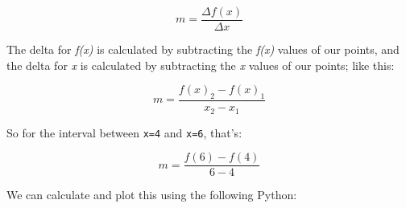 \documentclass[11pt]{article}
\begin{document}
\begin{equation}m = \frac{\Delta{f(x)}}{\Delta{x}} \end{equation}

The delta for \emph{f(x)} is calculated by subtracting the \emph{f(x)}
values of our points, and the delta for \emph{x} is calculated by
subtracting the \emph{x} values of our points; like this:

\begin{equation}m = \frac{f(x)_{2} - f(x)_{1}}{x_{2} - x_{1}} \end{equation}

So for the interval between \texttt{x=4} and \texttt{x=6}, that's:

\begin{equation}m = \frac{f(6) - f(4)}{6 - 4} \end{equation}

We can calculate and plot this using the following Python:
\end{document}
